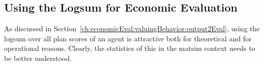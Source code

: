 \subsection{Using the Logsum for Economic Evaluation}

As discussed in Section~\ref{ch:economicEval:valuingBehavior:output2Eval}, using the \gls{logsum} over all plan scores of an agent is attractive both for theoretical and for operational reasons.  Clearly, the statistics of this in the \gls{matsim} context needs to be better understood.




